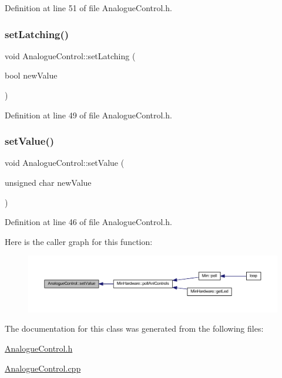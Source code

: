 Definition at line 51 of file Analogue\+Control.\+h.

\mbox{\label{class_analogue_control_af9129cb76c8fb8ea46e5fea1ea00be73}} 
\subsubsection{\texorpdfstring{set\+Latching()}{setLatching()}}
{\footnotesize\ttfamily void Analogue\+Control\+::set\+Latching (\begin{DoxyParamCaption}\item[{bool}]{new\+Value }\end{DoxyParamCaption})\hspace{0.3cm}{\ttfamily [inline]}}



Definition at line 49 of file Analogue\+Control.\+h.

\mbox{\label{class_analogue_control_a160ce73eb8eebdf131dca4dcebc44a42}} 
\subsubsection{\texorpdfstring{set\+Value()}{setValue()}}
{\footnotesize\ttfamily void Analogue\+Control\+::set\+Value (\begin{DoxyParamCaption}\item[{unsigned char}]{new\+Value }\end{DoxyParamCaption})\hspace{0.3cm}{\ttfamily [inline]}}



Definition at line 46 of file Analogue\+Control.\+h.

Here is the caller graph for this function\+:
\nopagebreak
\begin{figure}[H]
\begin{center}
\leavevmode
\includegraphics[width=350pt]{class_analogue_control_a160ce73eb8eebdf131dca4dcebc44a42_icgraph}
\end{center}
\end{figure}


The documentation for this class was generated from the following files\+:\begin{DoxyCompactItemize}
\item 
\hyperlink{_analogue_control_8h}{Analogue\+Control.\+h}\item 
\hyperlink{_analogue_control_8cpp}{Analogue\+Control.\+cpp}\end{DoxyCompactItemize}
